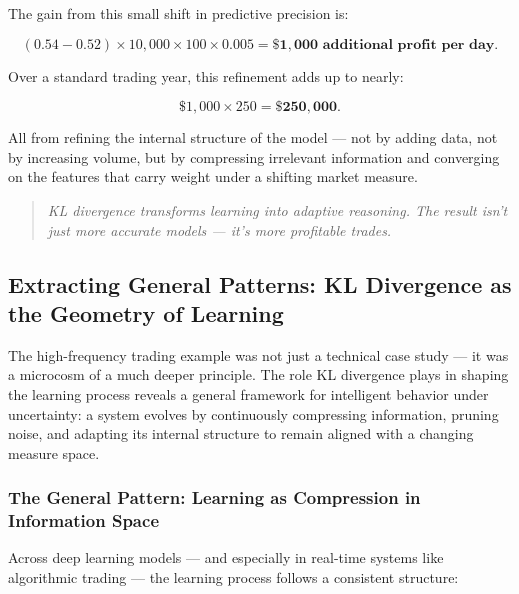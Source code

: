 The gain from this small shift in predictive precision is:

\[
(0.54 - 0.52) \times 10{,}000 \times 100 \times 0.005 = \mathbf{\$1{,}000 \text{ additional profit per day}}.
\]

Over a standard trading year, this refinement adds up to nearly:

\[
\$1{,}000 \times 250 = \mathbf{\$250{,}000}.
\]

All from refining the internal structure of the model — not by adding data, not by increasing volume, but by compressing irrelevant information and converging on the features that carry weight under a shifting market measure.

\begin{quote}
\textit{KL divergence transforms learning into adaptive reasoning. The result isn’t just more accurate models — it’s more profitable trades.}
\end{quote}

\subsection{Extracting General Patterns: KL Divergence as the Geometry of Learning}

The high-frequency trading example was not just a technical case study — it was a microcosm of a much deeper principle. The role KL divergence plays in shaping the learning process reveals a general framework for intelligent behavior under uncertainty: a system evolves by continuously compressing information, pruning noise, and adapting its internal structure to remain aligned with a changing measure space.

\subsubsection{The General Pattern: Learning as Compression in Information Space}

Across deep learning models — and especially in real-time systems like algorithmic trading — the learning process follows a consistent structure:

